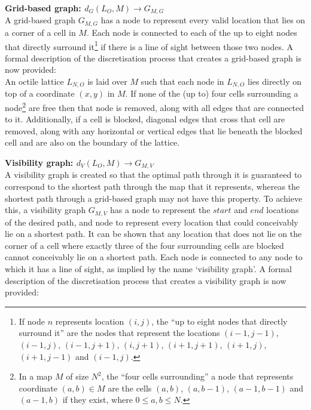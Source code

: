 \documentclass[12pt,notitlepage]{report}
\begin{document}
\begin{description}
\item{\bfseries Grid-based graph: $d_{G}(L_{O},M) \rightarrow G_{M,G}$}\\
A grid-based graph $G_{M,G}$ has a node to represent every valid location that lies on a corner of a cell in $M$. Each node is connected to each of the up to eight nodes that directly surround it\footnote{If node $n$ represents location $(i,j)$, the ``up to eight nodes that directly surround it'' are the nodes that represent the locations $(i-1,j-1)$, $(i-1,j)$, $(i-1,j+1)$, $(i,j+1)$, $(i+1,j+1)$, $(i+1,j)$, $(i+1,j-1)$ and $(i-1,j)$.} if there is a line of sight between those two nodes. A formal description of the discretisation process that creates a grid-based graph is now provided:\\

An octile lattice $L_{N,O}$ is laid over $M$ such that each node in $L_{N,O}$ lies directly on top of a coordinate $(x,y)$ in $M$. If none of the (up to) four cells surrounding a node\footnote{In a map $M$ of size $N^{2}$, the ``four cells surrounding'' a node that represents coordinate $(a,b) \in M$ are the cells $(a,b)$, $(a,b-1)$, $(a-1,b-1)$ and $(a-1,b)$ if they exist, where $0 \leq a,b \leq N$.} are free then that node is removed, along with all edges that are connected to it. Additionally, if a cell is blocked, diagonal edges that cross that cell are removed, along with any horizontal or vertical edges that lie beneath the blocked cell and are also on the boundary of the lattice.

\item{\bfseries Visibility graph: $d_{V}(L_{O},M) \rightarrow G_{M,V}$}\\
A visibility graph is created so that the optimal path through it is guaranteed to correspond to the shortest path through the map that it represents, whereas the shortest path through a grid-based graph may not\cite{Nash11} have this property. To achieve this, a visibility graph $G_{M,V}$ has a node to represent the $start$ and $end$ locations of the desired path, and node to represent every location that could conceivably lie on a shortest path. It can be shown\cite{Nash11} that any location that does not lie on the corner of a cell where exactly three of the four surrounding cells are blocked cannot conceivably lie on a shortest path. Each node is connected to any node to which it has a line of sight, as implied by the name `visibility graph'. A formal description of the discretisation process that creates a visibility graph is now provided:\\


\end{description}
\end{document}
